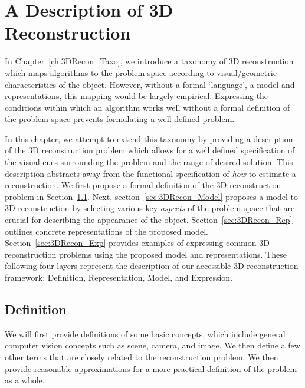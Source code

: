
\chapter{A Description of 3D Reconstruction}
\label{ch:3DRecon_Desc}
In Chapter~\ref{ch:3DRecon_Taxo}, we introduce a taxonomy of 3D reconstruction which maps algorithms to the problem space according to visual/geometric characteristics of the object. However, without a formal `language', \ie a model and representations, this mapping would be largely empirical. Expressing the conditions within which an algorithm works well without a formal definition of the problem space prevents formulating a well defined problem.

In this chapter, we attempt to extend this taxonomy by providing a description of the 3D reconstruction problem which allows for a well defined specification of the visual cues surrounding the problem and the range of desired solution. This description abstracts away from the functional specification of \textit{how} to estimate a reconstruction. We first propose a formal definition of the 3D reconstruction problem in Section~\ref{sec:3DRecon_Def}. Next, section~\ref{sec:3DRecon_Model} proposes a model to 3D reconstruction by selecting various key \textit{aspects} of the problem space that are crucial for describing the appearance of the object. Section~\ref{sec:3DRecon_Rep} outlines concrete representations of the proposed model. Section~\ref{sec:3DRecon_Exp} provides examples of expressing common 3D reconstruction problems using the proposed model and representations. These following four layers represent the description of our accessible 3D reconstruction framework: Definition, Representation, Model, and Expression.


\section{Definition}
\label{sec:3DRecon_Def}
We will first provide definitions of some basic concepts, which include general computer vision concepts such as scene, camera, and image. We then define a few other terms that are closely related to the reconstruction problem. We then provide reasonable approximations for a more practical definition of the problem as a whole.

